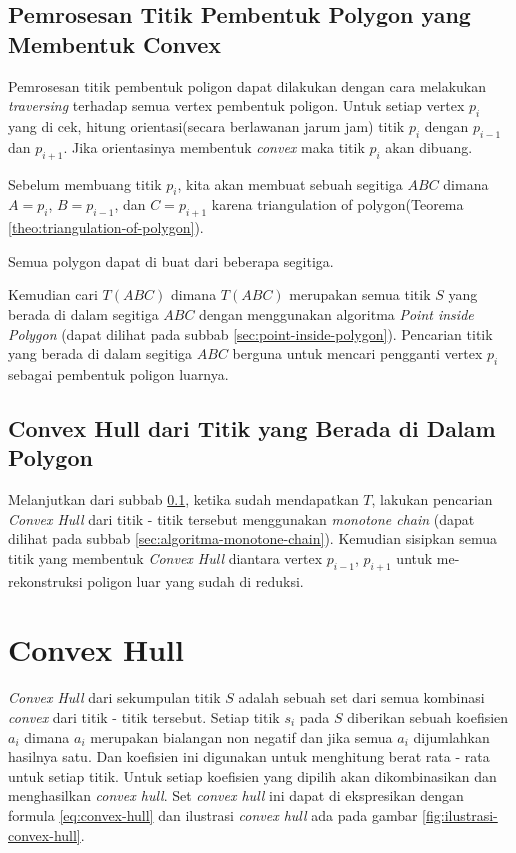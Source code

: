 \subsection{Pemrosesan Titik Pembentuk Polygon yang Membentuk Convex}
\label{sec:pemrosesan-titik-pembentuk-polygon-yang-membentuk-convex}
Pemrosesan titik pembentuk poligon dapat dilakukan dengan cara melakukan \textit{traversing} terhadap semua vertex pembentuk poligon. Untuk setiap vertex $p_i$ yang di cek, hitung orientasi(secara berlawanan jarum jam) titik $p_i$ dengan $p_{i-1}$ dan $ p_{i+1}$. Jika orientasinya membentuk \textit{convex} maka titik $p_i$ akan dibuang.
\par Sebelum membuang titik $p_i$, kita akan membuat sebuah segitiga $ABC$ dimana $A=p_i$, $B=p_{i-1}$, dan $C=p_{i+1}$ karena triangulation of polygon(Teorema \ref{theo:triangulation-of-polygon}).
\begin{theo}
    \label{theo:triangulation-of-polygon}
	Semua polygon dapat di buat dari beberapa segitiga.
\end{theo}
Kemudian cari $T(ABC)$ dimana $T(ABC)$ merupakan semua titik $S$ yang berada di dalam segitiga $ABC$ dengan menggunakan algoritma \textit{Point inside Polygon} (dapat dilihat pada subbab \ref{sec:point-inside-polygon}). Pencarian titik yang berada di dalam segitiga $ABC$ berguna untuk mencari pengganti vertex $p_i$ sebagai pembentuk poligon luarnya.

\subsection{Convex Hull dari Titik yang Berada di Dalam Polygon}
\label{sec:convex-hull-dari-titik-yang-berada-di-dalam-polygon}
Melanjutkan dari subbab \ref{sec:pemrosesan-titik-pembentuk-polygon-yang-membentuk-convex}, ketika sudah mendapatkan $T$, lakukan pencarian \textit{Convex Hull} dari titik - titik tersebut menggunakan \textit{monotone chain} (dapat dilihat pada subbab \ref{sec:algoritma-monotone-chain}). Kemudian sisipkan semua titik yang membentuk \textit{Convex Hull} diantara vertex $p_{i-1}$, $p_{i+1}$ untuk me-rekonstruksi poligon luar yang sudah di reduksi.

\section{Convex Hull}
\label{sec:convex-hull}
\textit{Convex Hull} dari sekumpulan titik $S$ adalah sebuah set dari semua kombinasi \textit{convex} dari titik - titik tersebut. Setiap titik $s_i$ pada $S$ diberikan sebuah koefisien $a_i$ dimana $a_i$ merupakan bialangan non negatif dan jika semua $a_i$ dijumlahkan hasilnya satu. Dan koefisien ini digunakan untuk menghitung berat rata - rata untuk setiap titik. Untuk setiap koefisien yang dipilih akan dikombinasikan dan menghasilkan \textit{convex hull}. Set \textit{convex hull} ini dapat di ekspresikan dengan formula \eqref{eq:convex-hull} dan ilustrasi \textit{convex hull} ada pada gambar \ref{fig:ilustrasi-convex-hull}.

